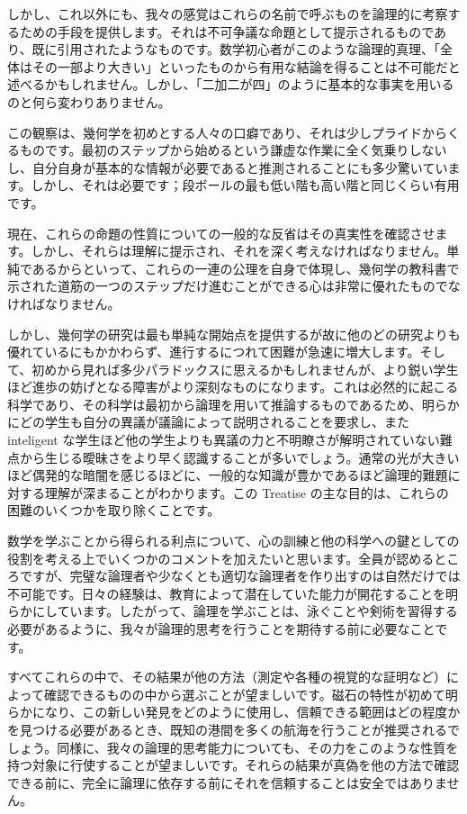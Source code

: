 \documentclass[a4paper,11pt,openany]{ltjsbook}
\begin{document}
しかし、これ以外にも、我々の感覚はこれらの名前で呼ぶものを論理的に考察するための手段を提供します。それは不可争議な命題として提示されるものであり、既に引用されたようなものです。数学初心者がこのような論理的真理、「全体はその一部より大きい」といったものから有用な結論を得ることは不可能だと述べるかもしれません。しかし、「二加二が四」のように基本的な事実を用いるのと何ら変わりありません。

この観察は、幾何学を初めとする人々の口癖であり、それは少しプライドからくるものです。最初のステップから始めるという謙虚な作業に全く気乗りしないし、自分自身が基本的な情報が必要であると推測されることにも多少驚いています。しかし、それは必要です；段ボールの最も低い階も高い階と同じくらい有用です。

現在、これらの命題の性質についての一般的な反省はその真実性を確認させます。しかし、それらは理解に提示され、それを深く考えなければなりません。単純であるからといって、これらの一連の公理を自身で体現し、幾何学の教科書で示された道筋の一つのステップだけ進むことができる心は非常に優れたものでなければなりません。

しかし、幾何学の研究は最も単純な開始点を提供するが故に他のどの研究よりも優れているにもかかわらず、進行するにつれて困難が急速に増大します。そして、初めから見れば多少パラドックスに思えるかもしれませんが、より鋭い学生ほど進歩の妨げとなる障害がより深刻なものになります。これは必然的に起こる科学であり、その科学は最初から論理を用いて推論するものであるため、明らかにどの学生も自分の異議が議論によって説明されることを要求し、また inteligent な学生ほど他の学生よりも異議の力と不明瞭さが解明されていない難点から生じる曖昧さをより早く認識することが多いでしょう。通常の光が大きいほど偶発的な暗闇を感じるほどに、一般的な知識が豊かであるほど論理的難題に対する理解が深まることがわかります。この Treatise の主な目的は、これらの困難のいくつかを取り除くことです。

数学を学ぶことから得られる利点について、心の訓練と他の科学への鍵としての役割を考える上でいくつかのコメントを加えたいと思います。全員が認めるところですが、完璧な論理者や少なくとも適切な論理者を作り出すのは自然だけでは不可能です。日々の経験は、教育によって潜在していた能力が開花することを明らかにしています。したがって、論理を学ぶことは、泳ぐことや剣術を習得する必要があるように、我々が論理的思考を行うことを期待する前に必要なことです。

すべてこれらの中で、その結果が他の方法（測定や各種の視覚的な証明など）によって確認できるものの中から選ぶことが望ましいです。磁石の特性が初めて明らかになり、この新しい発見をどのように使用し、信頼できる範囲はどの程度かを見つける必要があるとき、既知の港間を多くの航海を行うことが推奨されるでしょう。同様に、我々の論理的思考能力についても、その力をこのような性質を持つ対象に行使することが望ましいです。それらの結果が真偽を他の方法で確認できる前に、完全に論理に依存する前にそれを信頼することは安全ではありません。
\end{document}
